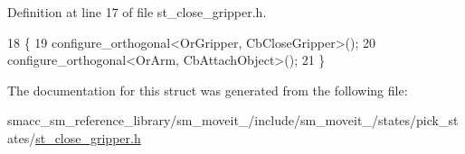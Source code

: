 Definition at line 17 of file st\+\_\+close\+\_\+gripper.\+h.


\begin{DoxyCode}
18          \{
19             configure\_orthogonal<OrGripper, CbCloseGripper>();
20             configure\_orthogonal<OrArm, CbAttachObject>();
21          \}
\end{DoxyCode}


The documentation for this struct was generated from the following file\+:\begin{DoxyCompactItemize}
\item 
smacc\+\_\+sm\+\_\+reference\+\_\+library/sm\+\_\+moveit\+\_/include/sm\+\_\+moveit\+\_/states/pick\+\_\+states/\hyperlink{4_2include_2sm__moveit__4_2states_2pick__states_2st__close__gripper_8h}{st\+\_\+close\+\_\+gripper.\+h}\end{DoxyCompactItemize}
